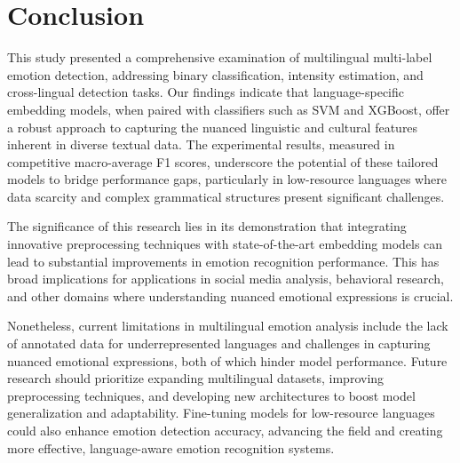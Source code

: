 \section{Conclusion}
This study presented a comprehensive examination of multilingual multi-label emotion detection, addressing binary classification, intensity estimation, and cross-lingual detection tasks. Our findings indicate that language-specific embedding models, when paired with classifiers such as SVM and XGBoost, offer a robust approach to capturing the nuanced linguistic and cultural features inherent in diverse textual data. The experimental results, measured in competitive macro-average F1 scores, underscore the potential of these tailored models to bridge performance gaps, particularly in low-resource languages where data scarcity and complex grammatical structures present significant challenges.

The significance of this research lies in its demonstration that integrating innovative preprocessing techniques with state-of-the-art embedding models can lead to substantial improvements in emotion recognition performance. This has broad implications for applications in social media analysis, behavioral research, and other domains where understanding nuanced emotional expressions is crucial.

Nonetheless, current limitations in multilingual emotion analysis include the lack of annotated data for underrepresented languages and challenges in capturing nuanced emotional expressions, both of which hinder model performance. Future research should prioritize expanding multilingual datasets, improving preprocessing techniques, and developing new architectures to boost model generalization and adaptability. Fine-tuning models for low-resource languages could also enhance emotion detection accuracy, advancing the field and creating more effective, language-aware emotion recognition systems.


